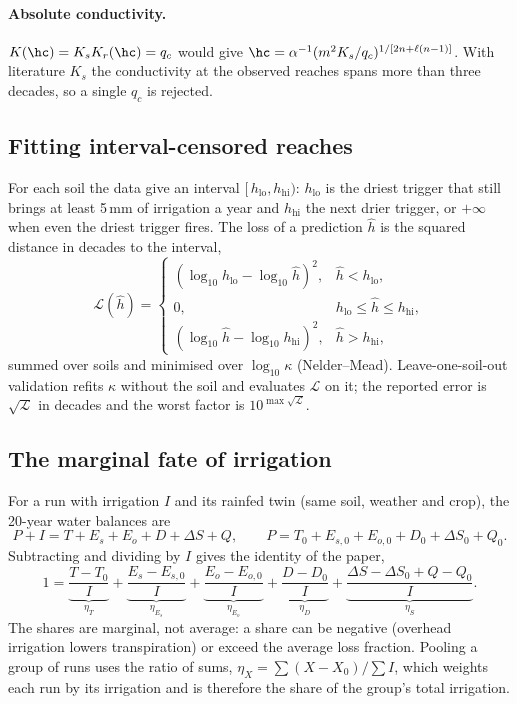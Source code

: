 \paragraph{Absolute conductivity.} $K(\hc)=K_s K_r(\hc)=q_c$ would give $\hc=\alpha^{-1}(m^{2}K_s/q_c)^{1/[2n+\ell(n-1)]}$. With literature $K_s$ the conductivity at the observed reaches spans more than three decades, so a single $q_c$ is rejected.

\subsection{Fitting interval-censored reaches}
For each soil the data give an interval $[\,h_{\mathrm{lo}},h_{\mathrm{hi}})$: $h_{\mathrm{lo}}$ is the driest trigger that still brings at least 5\,mm of irrigation a year and $h_{\mathrm{hi}}$ the next drier trigger, or $+\infty$ when even the driest trigger fires. The loss of a prediction $\hat h$ is the squared distance in decades to the interval,
\begin{equation}
\mathcal L(\hat h)=\begin{cases}(\log_{10}h_{\mathrm{lo}}-\log_{10}\hat h)^2, & \hat h<h_{\mathrm{lo}},\\ 0, & h_{\mathrm{lo}}\le\hat h\le h_{\mathrm{hi}},\\ (\log_{10}\hat h-\log_{10}h_{\mathrm{hi}})^2, & \hat h>h_{\mathrm{hi}},\end{cases}
\end{equation}
summed over soils and minimised over $\log_{10}\kappa$ (Nelder--Mead). Leave-one-soil-out validation refits $\kappa$ without the soil and evaluates $\mathcal L$ on it; the reported error is $\sqrt{\mathcal L}$ in decades and the worst factor is $10^{\max\sqrt{\mathcal L}}$.

\subsection{The marginal fate of irrigation}
For a run with irrigation $I$ and its rainfed twin (same soil, weather and crop), the 20-year water balances are
\begin{equation}
P+I=T+E_s+E_o+D+\Delta S+Q,\qquad P=T_0+E_{s,0}+E_{o,0}+D_0+\Delta S_0+Q_0 .
\end{equation}
Subtracting and dividing by $I$ gives the identity of the paper,
\begin{equation}
1=\underbrace{\frac{T-T_0}{I}}_{\eta_T}+\underbrace{\frac{E_s-E_{s,0}}{I}}_{\eta_{E_s}}+\underbrace{\frac{E_o-E_{o,0}}{I}}_{\eta_{E_o}}+\underbrace{\frac{D-D_0}{I}}_{\eta_D}+\underbrace{\frac{\Delta S-\Delta S_0+Q-Q_0}{I}}_{\eta_S}.
\end{equation}
The shares are marginal, not average: a share can be negative (overhead irrigation lowers transpiration) or exceed the average loss fraction. Pooling a group of runs uses the ratio of sums, $\eta_X=\sum(X-X_0)/\sum I$, which weights each run by its irrigation and is therefore the share of the group's total irrigation.

